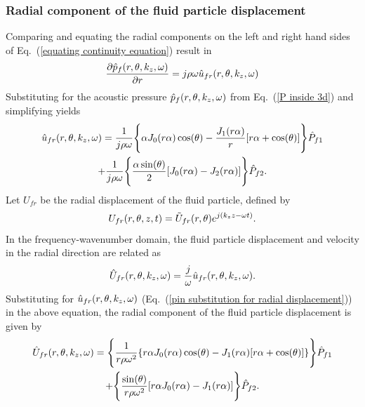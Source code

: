 \documentclass[11pt,cleanfoot]{asme2ej}
\begin{document}
\subsubsection{Radial component of the fluid particle displacement}
Comparing and equating the radial components on the left and right hand sides of Eq.~(\ref{equating continuity equation}) result in
\begin{equation}\label{pin i direction}
    \frac{\partial \Hat{p}_f(r,\theta,k_z,\omega)}{\partial r} = j\rho\omega \Hat{u}_{fr}(r,\theta,k_z,\omega)
\end{equation}
Substituting for the acoustic pressure $\Hat{p}_f(r,\theta,k_z,\omega)$ from Eq.~(\ref{P inside 3d}) and simplifying yields
\begin{multline}\label{pin substitution for radial displacement}
     \Hat{u}_{fr}(r,\theta,k_z,\omega) = \frac{1}{j\rho\omega}\Bigg\{\alpha J_0(r\alpha)\cos(\theta) - \frac{J_1(r\alpha)}{r}[r\alpha + \cos(\theta)]\Bigg\}\Hat{P}_{f1}\\ + \frac{1}{j\rho\omega}\Bigg\{\frac{\alpha\sin(\theta)}{2}[J_0(r\alpha) - J_2(r\alpha)]\Bigg\}\Hat{P}_{f2}.
\end{multline}
Let $U_{fr}$ be the radial displacement of the fluid particle, defined by 
\begin{equation}\label{rad disp 3d derivation}
    U_{fr}(r,\theta,z,t) = \Tilde{U}_{fr}(r,\theta) e^{j(k_z z - \omega t)}.
\end{equation}
In the frequency-wavenumber domain, the fluid particle displacement and velocity in the radial direction are related as
\begin{equation}\label{equating radial disp and vel}
    \Hat{U}_{fr}(r,\theta,k_z,\omega) = \frac{j}{\omega}\Hat{u}_{fr}(r,\theta,k_z,\omega).
\end{equation}
Substituting for $\Hat{u}_{fr}(r,\theta,k_z,\omega)$ (Eq.~(\ref{pin substitution for radial displacement})) in the above equation, the radial component of the fluid particle displacement is given by
\begin{multline}\label{radial displacement inside 3d}
    \Hat{U}_{fr}(r,\theta,k_z,\omega) = \Bigg\{\frac{1}{r\rho\omega^2}\{r\alpha J_0(r\alpha)\cos(\theta) - J_1(r\alpha)[r\alpha + \cos(\theta)]\}\Bigg\}\Hat{P}_{f1}\\ + \Bigg\{\frac{\sin(\theta)}{r\rho\omega^2}[r\alpha J_0(r\alpha) - J_1(r\alpha)]\Bigg\}\Hat{P}_{f2}.
\end{multline}
\end{document}
